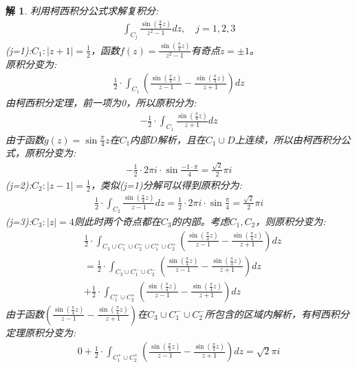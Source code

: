 \documentclass{ctexart}
\newcommand{\。}{．} %
\newenvironment{lanse}{
    \begin{tcolorbox}[breakable,enhanced, colback=qlan, boxrule=0pt, frame hidden,
        borderline west={0.7mm}{0.1mm}{slan}]
    }
    {\end{tcolorbox}}
\theoremstyle{t} %
\newtheorem*{tmhj}{\color{slan} 解}
\newenvironment{tm}{\begin{lanse}\begin{tmhj}}{\end{tmhj}\end{lanse}}
\begin{document}
\begin{tm}
利用柯西积分公式求解复积分:
\begin{align*}
    \int_{C_j}\frac{\sin\left(\frac{\pi}{4}z\right)}{z^2-1}dz,\quad j=1,2,3
\end{align*}
(j=1):$C_1:|z+1|=\frac{1}{2}$，函数$f(z)=\frac{\sin\left(\frac{\pi}{4}z\right)}{z^2-1}$有奇点$z=\pm 1$。\\
原积分变为:
\begin{align*}
    \frac{1}{2}\cdot \int_{C_1}\left(\frac{\sin\left(\frac{\pi}{4}z\right)}{z-1}-\frac{\sin\left(\frac{\pi}{4}z\right)}{z+1}\right)dz
\end{align*}
由柯西积分定理，前一项为0，所以原积分为:
\begin{align*}
    -\frac{1}{2}\cdot \int_{C_1}\frac{\sin\left(\frac{\pi}{4}z\right)}{z+1}dz
\end{align*}
由于函数$g(z)=\sin\frac{\pi}{4}z$在$C_1$内部$D$解析，且在$C_1\cup D$上连续，所以由柯西积分公式，原积分变为:
\begin{align*}
    -\frac{1}{2}\cdot 2\pi i\cdot \sin\frac{-1\cdot \pi}{4}=\frac{\sqrt{2}}{2}\pi i
\end{align*}
(j=2):$C_2:|z-1|=\frac{1}{2}$，类似(j=1)分解可以得到原积分为:
\begin{align*}
    \frac{1}{2}\cdot \int_{C_2}\frac{\sin\left(\frac{\pi}{4}z\right)}{z-1}dz=\frac{1}{2}\cdot 2\pi i\cdot \sin\frac{\pi}{4}=\frac{\sqrt{2}}{2}\pi i
\end{align*}
(j=3):$C_3:|z|=4$则此时两个奇点都在$C_3$的内部。考虑$C_1,C_2$，则原积分变为:
\begin{align*}
    &\frac{1}{2}\cdot \int_{C_3\cup C_1^-\cup C_2^-\cup C_1^+\cup C_2^+}\left(\frac{\sin\left(\frac{\pi}{4}z\right)}{z-1}-\frac{\sin\left(\frac{\pi}{4}z\right)}{z+1}\right)dz\\
    &=\frac{1}{2}\cdot \int_{C_3\cup C_1^-\cup C_2^-}\left(\frac{\sin\left(\frac{\pi}{4}z\right)}{z-1}-\frac{\sin\left(\frac{\pi}{4}z\right)}{z+1}\right)dz\\
    &+\frac{1}{2}\cdot \int_{C_1^+\cup C_2^+}\left(\frac{\sin\left(\frac{\pi}{4}z\right)}{z-1}-\frac{\sin\left(\frac{\pi}{4}z\right)}{z+1}\right)dz
\end{align*}
由于函数$\left(\frac{\sin\left(\frac{\pi}{4}z\right)}{z-1}-\frac{\sin\left(\frac{\pi}{4}z\right)}{z+1}\right)$在$C_3\cup C_1^-\cup C_2^-$所包含的区域内解析，有柯西积分定理原积分变为:
\begin{align*}
    0+\frac{1}{2}\cdot\int_{C_1^+\cup C_2^+}\left(\frac{\sin\left(\frac{\pi}{4}z\right)}{z-1}-\frac{\sin\left(\frac{\pi}{4}z\right)}{z+1}\right)dz=\sqrt{2}\pi i
\end{align*}
\end{tm}
\end{document}
